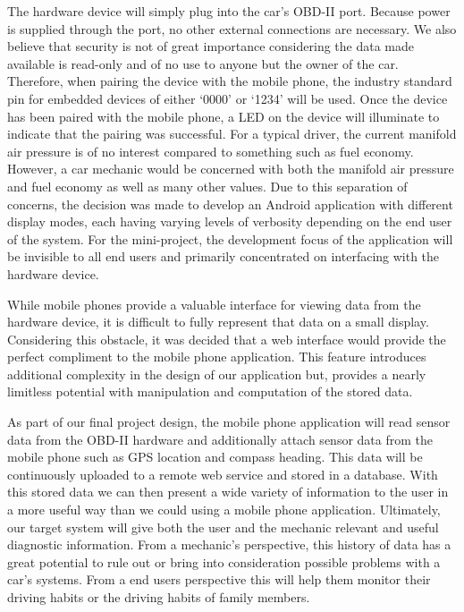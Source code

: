 \documentclass[12pt]{article}
\begin{document}
The hardware device will simply plug into the car’s OBD-II port.  Because power is supplied through the port, no other external connections are necessary.  We also believe that security is not of great importance considering the data made available is read-only and of no use to anyone but the owner of the car.  Therefore, when pairing the device with the mobile phone, the industry standard pin for embedded devices of either ‘0000’ or ‘1234’ will be used.  Once the device has been paired with the mobile phone, a LED on the device will illuminate to indicate that the pairing was successful.
For a typical driver, the current manifold air pressure is of no interest compared to something such as fuel economy.  However, a car mechanic would be concerned with both the manifold air pressure and fuel economy as well as many other values.  Due to this separation of concerns, the decision was made to develop an Android application with different display modes, each having varying levels of verbosity depending on the end user of the system.  For the mini-project, the development focus of the application will be invisible to all end users and primarily concentrated on interfacing with the hardware device.

While mobile phones provide a valuable interface for viewing data from the hardware device, it is difficult to fully represent that data on a small display.  Considering this obstacle, it was decided that a web interface would provide the perfect compliment to the mobile phone application.  This feature introduces additional complexity in the design of our application but, provides a nearly limitless potential with manipulation and computation of the stored data.

As part of our final project design, the mobile phone application will read sensor data from the OBD-II hardware and additionally attach sensor data from the mobile phone such as GPS location and compass heading.  This data will be continuously uploaded to a remote web service and stored in a database.  With this stored data we can then present a wide variety of information to the user in a more useful way than we could using a mobile phone application.
Ultimately, our target system will give both the user and the mechanic relevant and useful diagnostic information.  From a mechanic’s perspective, this history of data has a great potential to rule out or bring into consideration possible problems with a car’s systems.  From a end users perspective this will help them monitor their driving habits or the driving habits of family members.
\end{document}
